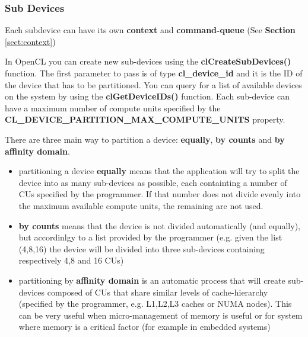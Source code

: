 \subsubsection{Sub Devices} \label{sect:DF-subdevices}
Each subdevice can have its own \textbf{context} and \textbf{command-queue} (See \textbf{Section} \ref{sect:context})

\begin{CLCode}
In OpenCL you can create new sub-devices using the \textbf{clCreateSubDevices()} function. The first parameter to pass is of type \textbf{cl\_device\_id} and it is the ID of the device that has to be partitioned. You can query for a list of available devices on the system by using the \textbf{clGetDeviceIDs()} function. Each sub-device can have a maximum number of compute units specified by the \textbf{CL\_DEVICE\_PARTITION\_MAX\_COMPUTE\_UNITS} property.
\end{CLCode}

There are three main way to partition a device: \textbf{equally}, \textbf{by counts} and \textbf{by affinity domain}.

\begin{itemize}
	\item partitioning a device \textbf{equally} means that the application will try to split the device into as many sub-devices as possible, each containting a number of CUs specified by the programmer. If that number does not divide evenly into the maximum available compute units, the remaining are not used.
	\item \textbf{by counts} means that the device is not divided automatically (and equally), but accordinlgy to a list provided by the programmer (e.g. given the list (4,8,16) the device will be divided into three sub-devices containing respectively 4,8 and 16 CUs)
	\item partitioning by \textbf{affinity domain} is an automatic process that will create sub-devices composed of CUs that share similar levels of cache-hierarchy (specified by the programmer, e.g. L1,L2,L3 caches or NUMA nodes). This can be very useful when micro-management of memory is useful or for system where memory is a critical factor (for example in  embedded systems)
\end{itemize}





